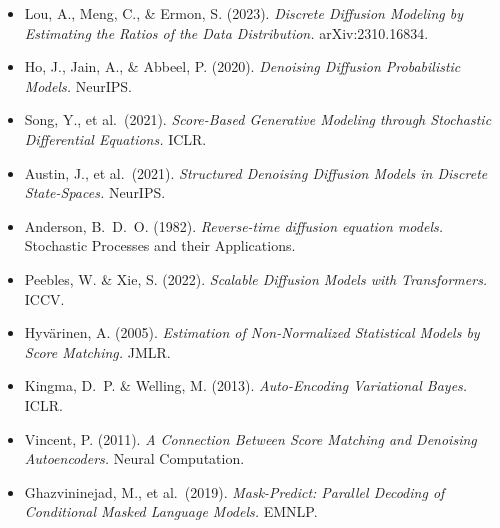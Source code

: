 \documentclass[11pt,a4paper]{article}
\begin{document}
\begin{itemize}[nosep]
  \item Lou, A., Meng, C., \& Ermon, S. (2023). \textit{Discrete Diffusion Modeling by Estimating the Ratios of the Data Distribution.} arXiv:2310.16834.
  \item Ho, J., Jain, A., \& Abbeel, P. (2020). \textit{Denoising Diffusion Probabilistic Models.} NeurIPS.
  \item Song, Y., et al.\ (2021). \textit{Score-Based Generative Modeling through Stochastic Differential Equations.} ICLR.
  \item Austin, J., et al.\ (2021). \textit{Structured Denoising Diffusion Models in Discrete State-Spaces.} NeurIPS.
  \item Anderson, B.\ D.\ O. (1982). \textit{Reverse-time diffusion equation models.} Stochastic Processes and their Applications.
  \item Peebles, W. \& Xie, S. (2022). \textit{Scalable Diffusion Models with Transformers.} ICCV.
  \item Hyv\"arinen, A. (2005). \textit{Estimation of Non-Normalized Statistical Models by Score Matching.} JMLR.
  \item Kingma, D.\ P. \& Welling, M. (2013). \textit{Auto-Encoding Variational Bayes.} ICLR.
  \item Vincent, P. (2011). \textit{A Connection Between Score Matching and Denoising Autoencoders.} Neural Computation.
  \item Ghazvininejad, M., et al.\ (2019). \textit{Mask-Predict: Parallel Decoding of Conditional Masked Language Models.} EMNLP.
\end{itemize}
\end{document}
